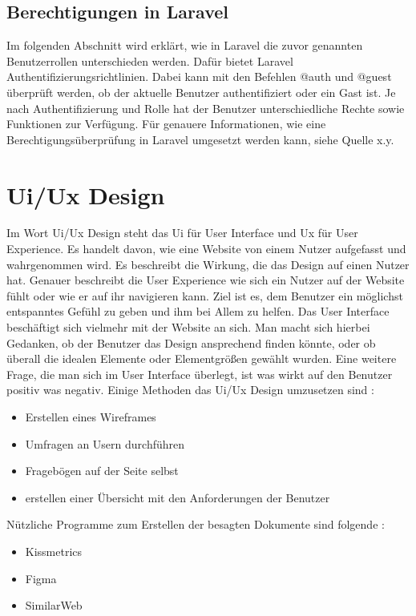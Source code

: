 \subsection{Berechtigungen in Laravel}
Im folgenden Abschnitt wird erklärt, wie in Laravel die zuvor genannten Benutzerrollen unterschieden werden.
Dafür bietet Laravel Authentifizierungsrichtlinien. Dabei kann mit den Befehlen @auth und @guest überprüft werden, ob der aktuelle Benutzer authentifiziert oder ein Gast ist. Je nach Authentifizierung und Rolle hat der Benutzer unterschiedliche Rechte sowie Funktionen zur Verfügung.
Für genauere Informationen, wie eine Berechtigungsüberprüfung in Laravel umgesetzt werden kann, siehe Quelle x.y.



\section{Ui/Ux Design}
Im Wort Ui/Ux Design steht das Ui für User Interface und Ux für User Experience. Es handelt davon, wie eine Website von einem Nutzer aufgefasst und wahrgenommen wird. Es beschreibt die Wirkung, die das Design auf einen Nutzer hat. Genauer beschreibt die User Experience wie sich ein Nutzer auf der Website fühlt oder wie er auf ihr navigieren kann. 
Ziel ist es, dem Benutzer ein möglichst entspanntes Gefühl zu geben und ihm bei Allem zu helfen. Das User Interface beschäftigt sich vielmehr mit der Website an sich. Man macht sich hierbei Gedanken, ob der Benutzer das Design ansprechend finden könnte, oder ob überall die idealen Elemente oder Elementgrößen gewählt wurden. Eine weitere Frage, die man sich im User Interface überlegt, ist was wirkt auf den Benutzer positiv was negativ. Einige Methoden das Ui/Ux Design umzusetzen sind : 

\begin{itemize}
	\item Erstellen eines Wireframes 
	\item Umfragen an Usern durchführen
	\item Fragebögen auf der Seite selbst 
	\item erstellen einer Übersicht mit den Anforderungen der Benutzer
\end{itemize}
Nützliche Programme zum Erstellen der besagten Dokumente  sind folgende : 
\begin{itemize}
	\item Kissmetrics
	\item Figma
	\item SimilarWeb
\end{itemize}

